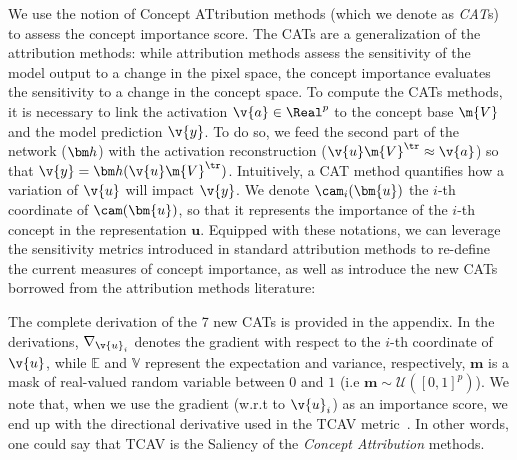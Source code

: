 We use the notion of Concept ATtribution methods (which we denote as \emph{CAT}s) to assess the concept importance score. The CATs are a generalization of the attribution methods: 
while attribution methods assess the sensitivity of the model output to a change in the pixel space, the concept importance evaluates the sensitivity to a change in the concept space. To compute the CATs methods, it is necessary to link the activation $\v{a} \in \Real^p$ to the concept base $\m{V}$ and the model prediction $\v{y}$. To do so, we feed the second part of the network ($\fb$) with the activation reconstruction ($\v{u} \m{V}^\tr \approx \v{a}$) so that $\v{y} = \fb(\v{u}\m{V}^\tr)$. Intuitively, a CAT method quantifies how a variation of  $\v{u}$ will impact $\v{y}$. 
We denote $\cam_i(\bm{u})$ the $i$-th coordinate of $\cam(\bm{u})$, so that it represents the importance of the $i$-th concept in the representation $\bm{u}$.  Equipped with these notations, we can leverage the sensitivity metrics introduced in standard attribution methods to re-define the current measures of concept importance, as well as introduce the new CATs borrowed from the attribution methods literature:


\vspace{3mm}



The complete derivation of the 7 new CATs is provided in the appendix. 
In the derivations, $\nabla_{\v{u}_i}$ denotes the gradient with respect to the $i$-th coordinate of $\v{u}$, while $\mathbb{E}$ and $\mathbb{V}$ represent the expectation and variance, respectively, $\mathbf{m}$ is a mask of real-valued random variable between $0$ and $1$ (i.e $\mathbf{m}\sim\mathcal{U}([0,1]^p)$). We note that, when we use the gradient (w.r.t to $\v{u}_i$) as an importance score, we end up with the directional derivative used in the TCAV metric~\cite{kim2018interpretability}. In other words, one could say that TCAV is the Saliency of the \textit{Concept Attribution} methods. 

